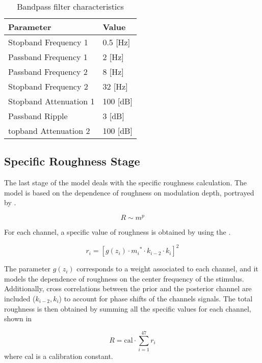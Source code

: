 \documentclass[../main.tex]{subfiles}
\begin{document}
\begin{modelchapter}
\begin{table}[!ht]
  \centering
  \begin{tabu} to \linewidth{XX}
    \toprule
    \rowfont\bfseries
    Parameter & Value \\
    \midrule
    Stopband Frequency 1 & 0.5 [Hz] \\
    Passband Frequency 1 & 2 [Hz] \\
    Passband Frequency 2 & 8 [Hz] \\
    Stopband Frequency 2 & 32 [Hz] \\
    Stopband Attenuation 1 & 100 [dB] \\
    Passband Ripple & 3 [dB] \\
    topband Attenuation 2 & 100 [dB] \\
    \bottomrule
  \end{tabu}
  \caption{Bandpass filter characteristics}
\label{tab:bandpass_filter}
\end{table}

\subsection{Specific Roughness Stage}

The last stage of the model deals with the specific roughness calculation. The
model is based on the dependence of roughness on modulation depth, portrayed
by .

\begin{equation}
  R \sim m^p
  \label{eq:roughness_modulation_depth}
\end{equation}

For each channel, a specific value of roughness is obtained by using the
.

\begin{equation}
  r_i = [g(z_i) \cdot {m_i}^* \cdot k_{i-2} \cdot k_i]^2
  \label{eq:ri}
\end{equation}

The parameter $g(z_i)$ corresponds to a weight associated to each channel, and
it models the dependence of roughness on the center frequency of the stimulus.
Additionally, cross correlations between the prior and the posterior channel
are included ($k_{i-2}, k_i$) to account for phase shifts of the channels
signals. The total roughness is then obtained by summing all the specific
values for each channel, shown in 

\begin{equation}
  R = \text{cal} \cdot \displaystyle\sum_{i=1}^{47} r_i
  \label{eq:total_roughness}
\end{equation}
where cal is a calibration constant.


\end{modelchapter}
\end{document}
